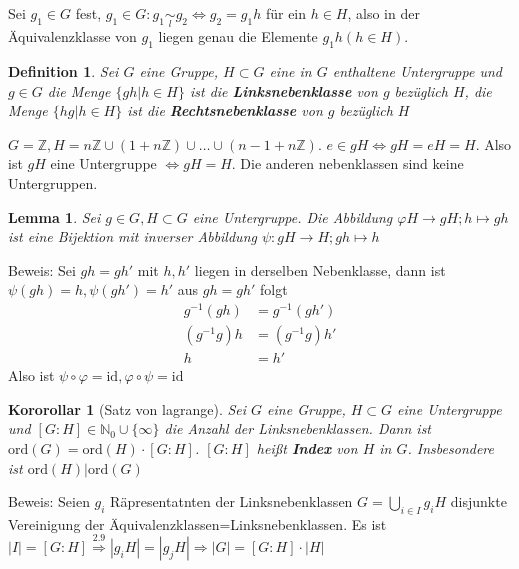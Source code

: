 \documentclass{article}
\newtheorem{defi}[thm]{Definition}
\newtheorem{lemma}[thm]{Lemma}
\newtheorem{korollar}[thm]{Kororollar}
\newcommand{\N}{\mathbb{N}}
\newcommand{\Z}{\mathbb{Z}}
\newcommand{\ord}{\text{ord}}
\newcommand{\id}{\text{id}}
\begin{document}
Sei $g_1\in G$ fest, $g_1\in G:g_1\underset{l}\sim g_2
\Leftrightarrow g_2=g_1h$ für ein $h\in H$, also
in der Äquivalenzklasse von $g_1$ liegen genau die Elemente
$g_1h(h\in H)$.

\begin{defi}
    Sei $G$ eine Gruppe, $H\subset G$ eine in $G$ enthaltene
    Untergruppe und $g\in G$ die Menge $\{gh|h\in H\}$
    ist die \textbf{Linksnebenklasse} von $g$ bezüglich $H$,
    die Menge $\{hg|h\in H\}$ ist die
    \textbf{Rechtsnebenklasse} von $g$ bezüglich $H$
\end{defi}
\color{purple}
$G=\Z,H=n\Z\cup(1+n\Z)\cup\hdots\cup(n-1+n\Z)$.
$e\in gH\Leftrightarrow gH=eH=H$. Also ist $gH$ eine
Untergruppe $\Leftrightarrow gH=H$. Die anderen
nebenklassen sind keine Untergruppen.
\color{black}
\begin{lemma}
    Sei $g\in G,H\subset G$ eine Untergruppe. Die Abbildung
    $\varphi H\to gH; h\mapsto gh$ ist eine Bijektion mit
    inverser Abbildung $\psi: gH\to H; gh\mapsto h$
\end{lemma}
Beweis:
Sei $gh=gh'$ mit $h,h'$ liegen in derselben Nebenklasse,
dann ist $\psi(gh)=h,\psi(gh')=h'$ aus $gh=gh'$
folgt
\begin{align*}
    g^{-1}(gh)&=g^{-1}(gh')\\
    (g^{-1}g)h&=(g^{-1}g)h'\\
    h&=h'
\end{align*}
Also ist $\psi\circ\varphi=\id,\varphi\circ\psi=\id$
\begin{korollar}[Satz von lagrange]
    Sei $G$ eine Gruppe, $H\subset G$ eine Untergruppe
    und $[G:H]\in\N_0\cup\{\infty\}$ die Anzahl der
    Linksnebenklassen. Dann ist $\ord(G)=\ord(H)\cdot[G:H]$.
    $[G:H]$ heißt \textbf{Index} von $H$ in $G$.
    Insbesondere ist $\ord(H)|\ord(G)$
\end{korollar}
Beweis:
Seien $g_i$ Räpresentatnten der Linksnebenklassen
$G=\underset{i\in I}\bigcup g_iH$ disjunkte Vereinigung
der Äquivalenzklassen=Linksnebenklassen. Es ist
$|I|=[G:H]\overset{2.9}\Rightarrow|g_iH|=|g_jH|
\Rightarrow|G|=[G:H]\cdot|H|$
\end{document}
